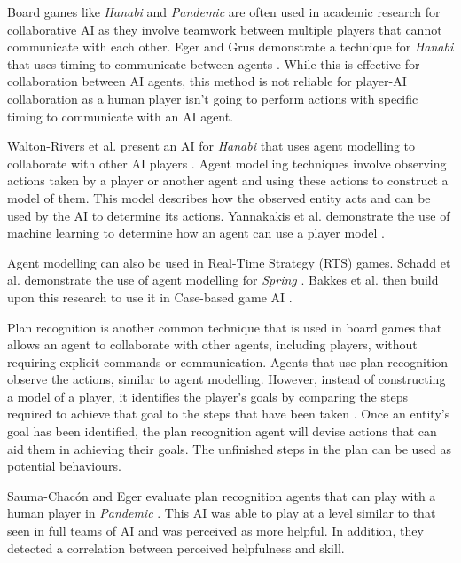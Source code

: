 \documentclass{IEEEtran}
\begin{document}
Board games like \textit{Hanabi} and \textit{Pandemic} are often used in academic research for collaborative AI as they involve teamwork between multiple players that cannot communicate with each other. Eger and Grus demonstrate a technique for \textit{Hanabi} that uses timing to communicate between agents \cite{WaitASecond2019}. While this is effective for collaboration between AI agents, this method is not reliable for player-AI collaboration as a human player isn't going to perform actions with specific timing to communicate with an AI agent.

Walton-Rivers et al. present an AI for \textit{Hanabi} that uses agent modelling to collaborate with other AI players \cite{EvaluatingHanabiAgents}. Agent modelling techniques involve observing actions taken by a player or another agent and using these actions to construct a model of them. This model describes how the observed entity acts and can be used by the AI to determine its actions. Yannakakis et al. demonstrate the use of machine learning to determine how an agent can use a player model \cite{yannakakis2013playermodelling}.

Agent modelling can also be used in Real-Time Strategy (RTS) games. Schadd et al. demonstrate the use of agent modelling for \textit{Spring} \cite{OpponentModellingRTS2007}. Bakkes et al. then build upon this research to use it in Case-based game AI \cite{bakkes2009opponentmodelling}.


Plan recognition is another common technique that is used in board games that allows an agent to collaborate with other agents, including players, without requiring explicit commands or communication. Agents that use plan recognition observe the actions, similar to agent modelling. However, instead of constructing a model of a player, it identifies the player's goals by comparing the steps required to achieve that goal to the steps that have been taken \cite{GeneratingCollabBehaviourPlanRecognition2016}. Once an entity’s goal has been identified, the plan recognition agent will devise actions that can aid them in achieving their goals. The unfinished steps in the plan can be used as potential behaviours.

Sauma-Chacón and Eger evaluate plan recognition agents that can play with a human player in \textit{Pandemic} \cite{PandemicPlanRecognition2021}. This AI was able to play at a level similar to that seen in full teams of AI and was perceived as more helpful. In addition, they detected a correlation between perceived helpfulness and skill.
\end{document}
